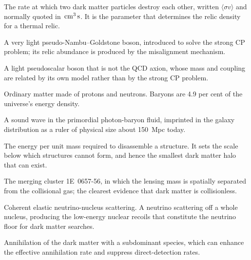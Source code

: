 \vspace{8pt}
\begin{description}[style=nextline,leftmargin=0pt,labelwidth=0pt,labelsep=0pt,
  font=\sffamily\bfseries\small,itemsep=5pt]

\item[Annihilation cross section] The rate at which two dark matter
particles destroy each other, written $\langle\sigma v\rangle$ and normally
quoted in $\,\mathrm{cm}^{3}\,\mathrm{s}$. It is the parameter that determines the relic
density for a thermal relic.

\item[Axion] A very light pseudo-Nambu--Goldstone boson, introduced to solve
the strong CP problem; its relic abundance is produced by the misalignment
mechanism.

\item[Axion-like particle] A light pseudoscalar boson that is not the QCD
axion, whose mass and coupling are related by its own model rather than by
the strong CP problem.

\item[Baryon] Ordinary matter made of protons and neutrons. Baryons are
4.9 per cent of the universe's energy density.

\item[Baryon acoustic oscillation] A sound wave in the primordial
photon-baryon fluid, imprinted in the galaxy distribution as a ruler of
physical size about 150~Mpc today.

\item[Binding energy] The energy per unit mass required to disassemble a
structure. It sets the scale below which structures cannot form, and hence
the smallest dark matter halo that can exist.

\item[Bullet Cluster] The merging cluster 1E~0657-56, in which the lensing
mass is spatially separated from the collisional gas; the clearest evidence
that dark matter is collisionless.

\item[CEvNS] Coherent elastic neutrino-nucleus scattering. A neutrino
scattering off a whole nucleus, producing the low-energy nuclear recoils
that constitute the neutrino floor for dark matter searches.

\item[Coannihilation] Annihilation of the dark matter with a subdominant
species, which can enhance the effective annihilation rate and suppress
direct-detection rates.


\end{description}
